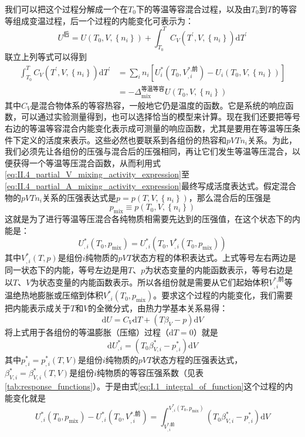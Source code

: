 \documentclass[main.tex]{subfiles}
\begin{document}
我们可以把这个过程分解成一个在$T_0$下的等温等容混合过程，以及由$T_0$到$T$的等容等组成变温过程，后一个过程的内能变化可表示为：
\[U^\text{后}=U\left(T_0,V,\left\{n_i\right\}\right)+\int_{T_0}^TC_V\left(T^\prime,V,\left\{n_i\right\}\right)\mathrm{d}T^\prime\]
联立上列等式可以得到
\begin{align*}
  \int_{T_0}^TC_V\left(T^\prime,V,\left\{n_i\right\}\right)\mathrm{d}T^\prime & =\sum_i n_i\left[U_i^*\left(T_0,V_{,i}^\text{*,前}\right)-U_i\left(T_0,V,\left\{n_i\right\}\right)\right] \\
                                                                              & =-\Delta_\text{mix}^\text{等温等容}U\left(T_0,V,\left\{n_i\right\}\right)
\end{align*}
其中$C_V$是混合物体系的等容热容，一般地它仍是温度的函数。它是系统的响应函数，可以通过实验测量得到，也可以选择恰当的模型来计算。现在我们还要把等号右边的等温等容混合内能变化表示成可测量的响应函数，尤其是要用在等温等压条件下定义的活度来表示。这些必然也要联系到各组份的热容和$pVTn_i$关系。为此，我们必须先让各组份的压强与混合后的压强相同，再让它们发生等温等压混合，以便获得一个等温等压混合函数，从而利用式\eqref{eq:II.4_partial_V_mixing_activity_expression}至\eqref{eq:II.4_partial_A_mixing_activity_expression}最终写成活度表达式。假定混合物的$pVTn_i$关系的压强表达式是$p=p\left(T,V,\left\{n_i\right\}\right)$，那么混合后的压强是
\[p_\text{mix}\equiv p\left(T_0,V,\left\{n_i\right\}\right)\]
这就是为了进行等温等压混合各纯物质相需要先达到的压强值，在这个状态下的内能是：
\[U_{,i}^*\left(T_0,p_\text{mix}\right)=U_{,i}^*\left(T_0,V_{,i}^*\left(T_0,p_\text{mix}\right)\right)\]
其中$V_{,i}^*\left(T,p\right)$是组份$i$纯物质的$pVT$状态方程的体积表达式。上式等号左右两边是同一状态下的内能，等号左边是用$T$、$p$为状态变量的内能函数表示，等号右边是以$T$、$V$为状态变量的内能函数表示。所以各组份就是需要从它们起始体积$V_{,i}^\text{*,前}$等温绝热地膨胀或压缩到体积$V_{,i}^*\left(T_0,p_\text{mix}\right)$。要求这个过程的内能变化，我们需要把内能表示成关于$T$和$V$的全微分式，由热力学基本关系易得：
\[\mathrm{d}U=C_V\mathrm{d}T+\left(T\beta_V-p\right)\mathrm{d}V\]
将上式用于各组份的等温膨胀（压缩）过程（$\mathrm{d}T=0$）就是
\[\mathrm{d}U_{,i}^*=\left(T_0\beta_{V,i}^*-p_{,i}^*\right)\mathrm{d}V\]
其中$p_{,i}^*=p_{,i}^*\left(T,V\right)$是组份$i$纯物质的$pVT$状态方程的压强表达式，$\beta_{V,i}^*=\beta_{V,i}^*\left(T,V\right)$是组份$i$纯物质的等容压强系数（见表\ref{tab:response_functions}）。于是由式\eqref{eq:I.1_integral_of_function}这个过程的内能变化就是
\[U_{,i}^*\left(T_0,p_\text{mix}\right)-U_{,i}^*\left(T_0,V_{,i}^\text{*,前}\right)=\int_{V_{,i}^\text{*,前}}^{V_{,i}^*\left(T_0,p_\text{mix}\right)}\left(T_0\beta_{V,i}^*-p_{,i}^*\right)\mathrm{d}V\]
\end{document}

